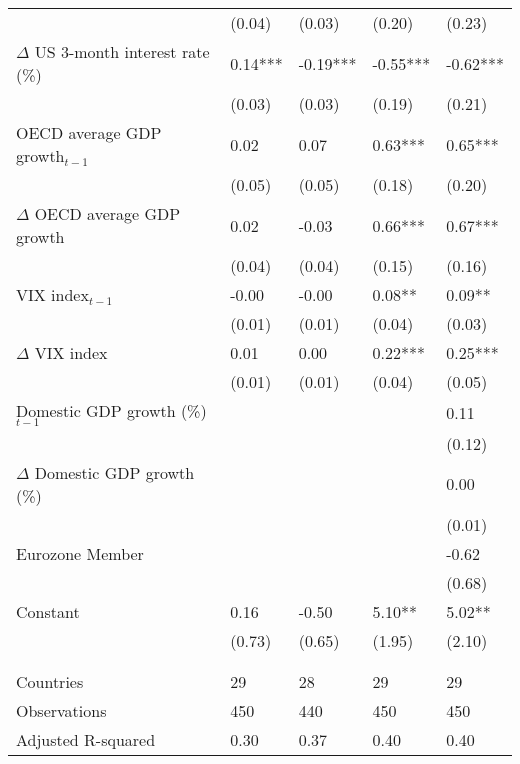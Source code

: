 {\begin{tabular}{lp{2cm}p{2cm}p{2cm}p{2cm}}
   & (0.04) & (0.03) & (0.20) & (0.23) \\ 
  $\Delta$ US 3-month interest rate (\%) & 0.14*** & -0.19*** & -0.55*** & -0.62*** \\ 
   & (0.03) & (0.03) & (0.19) & (0.21) \\ 
  OECD average GDP growth$_{t-1}$ & 0.02 & 0.07 & 0.63*** & 0.65*** \\ 
   & (0.05) & (0.05) & (0.18) & (0.20) \\ 
  $\Delta$ OECD average GDP growth & 0.02 & -0.03 & 0.66*** & 0.67*** \\ 
   & (0.04) & (0.04) & (0.15) & (0.16) \\ 
  VIX index$_{t-1}$ & -0.00 & -0.00 & 0.08** & 0.09** \\ 
   & (0.01) & (0.01) & (0.04) & (0.03) \\ 
  $\Delta$ VIX index & 0.01 & 0.00 & 0.22*** & 0.25*** \\ 
   & (0.01) & (0.01) & (0.04) & (0.05) \\ 
  Domestic GDP growth (\%)$_{t-1}$ &  &  &  & 0.11 \\ 
   &  &  &  & (0.12) \\ 
  $\Delta$ Domestic GDP growth (\%) &  &  &  & 0.00 \\ 
   &  &  &  & (0.01) \\ 
  Eurozone Member &  &  &  & -0.62 \\ 
   &  &  &  & (0.68) \\ 
  Constant & 0.16 & -0.50 & 5.10** & 5.02** \\ 
   & (0.73) & (0.65) & (1.95) & (2.10) \\ 
   &  &  &  &  \\ 
   &  &  &  &  \\ 
  Countries & 29 & 28 & 29 & 29 \\ 
  Observations & 450 & 440 & 450 & 450 \\ 
  Adjusted R-squared & 0.30 & 0.37 & 0.40 & 0.40 \\ 
   \hline
\end{tabular}
}
